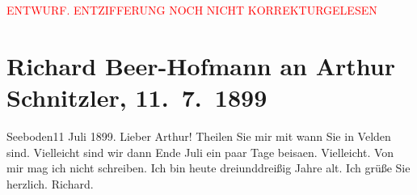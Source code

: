 
\begin{center}
            \textcolor{red}{ENTWURF. ENTZIFFERUNG NOCH NICHT KORREKTURGELESEN}
                      \end{center}
            
               \section[Richard Beer-Hofmann an Arthur Schnitzler, 11. 7. 1899]{ Richard Beer-Hofmann an Arthur Schnitzler, 11. 7. 1899}\nopagebreak{}\rehead{ }\begin{ledgroupsized}[t]{13cm}\normalsize\beginnumbering{} \toendnotes[C]{\smallbreak\pagebreak[2]} 
\pstart
           {\pb}Seeboden11 Juli 1899.\pend
           \pstart
           Lieber Arthur! Theilen Sie mir mit wann Sie in Velden
                sind. Vielleicht sind wir dann Ende
                  Juli ein paar Tage beisa{\geminationm}en. Vielleicht. Von
               mir mag ich nicht schreiben. Ich bin heute dreiunddreißig Jahre alt.\pend
           \pstart
           {\pb}Ich grüße Sie herzlich.\pend
           \pstart \spacefill\mbox{Richard.}\pend{}\endnumbering{}\end{ledgroupsized}  \newcommand{\dateiname}{L00938}\newcommand{\titel}{Richard Beer-Hofmann an Arthur Schnitzler, 11. 7. 1899}\newcommand{\editorInnen}{Martin Anton Müller und Gerd-Hermann Susen}
      